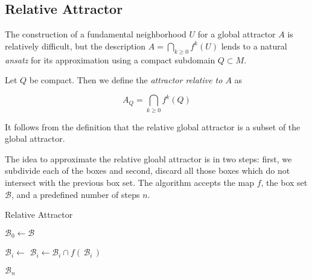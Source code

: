 
\subsection{Relative Attractor}

The construction of a fundamental neighborhood $U$ for a global attractor $A$ is
relatively difficult, but the description $A = \bigcap_{k \geq 0} f^k(U)$ lends to 
a natural \emph{ansatz} for its approximation using a compact subdomain $Q \subset M$. \\

\begin{definition}
    Let $Q$ be compact. Then we define the \emph{attractor relative to $A$} as

    \begin{equation}
        A_Q = \bigcap\limits_{k \geq 0} f^k (Q)
    \end{equation}

\end{definition}

\begin{remark}
    It follows from the definition that the relative global attractor is a subset of the 
    global attractor.\\
\end{remark}

The idea to approximate the relative gloabl attractor is in two steps: first, we subdivide 
each of the boxes and second, discard all those boxes which do not intersect with the 
previous box set. The algorithm accepts the map $f$, the box set $\mathcal{B}$, and a 
predefined number of steps $n$. 

\begin{algorithm}
    \caption{Relative Attractor}
    \label{alg:relativeattractor}
    \begin{algorithmic}[1]
        \State $\mathcal{B}_0 \gets \mathcal{B}$

            \State $\mathcal{B}_i \gets$ 
            \State $\mathcal{B}_i \gets \mathcal{B}_i \cap f (\,\mathcal{B}_i\,)$
        \EndFor

        \State \Return $\mathcal{B}_n$ 

    \end{algorithmic}
\end{algorithm}

